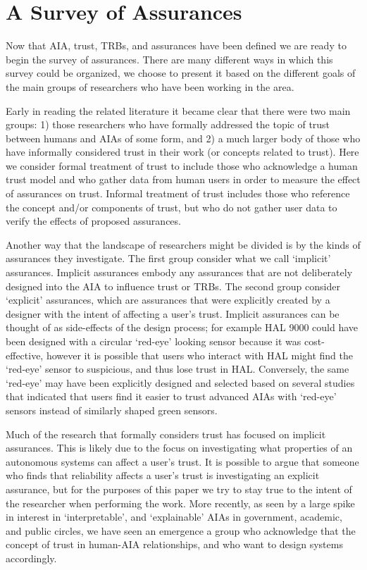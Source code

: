

\section{A Survey of Assurances} \label{sec:survey}
Now that AIA, trust, TRBs, and assurances have been defined we are ready to begin the survey of assurances. There are many different ways in which this survey could be organized, we choose to present it based on the different goals of the main groups of researchers who have been working in the area.

Early in reading the related literature it became clear that there were two main groups: 1) those researchers who have formally addressed the topic of trust between humans and AIAs of some form, and 2) a much larger body of those who have informally considered trust in their work (or concepts related to trust). Here we consider formal treatment of trust to include those who acknowledge a human trust model and who gather data from human users in order to measure the effect of assurances on trust. Informal treatment of trust includes those who reference the concept and/or components of trust, but who do not gather user data to verify the effects of proposed assurances. 

Another way that the landscape of researchers might be divided is by the kinds of assurances they investigate. The first group consider what we call `implicit' assurances. Implicit assurances embody any assurances that are not deliberately designed into the AIA to influence trust or TRBs. The second group consider `explicit' assurances, which are assurances that were explicitly created by a designer with the intent of affecting a user's trust. Implicit assurances can be thought of as side-effects of the design process; for example HAL 9000 could have been designed with a circular `red-eye' looking sensor because it was cost-effective, however it is possible that users who interact with HAL might find the `red-eye' sensor to suspicious, and thus lose trust in HAL. Conversely, the same `red-eye' may have been explicitly designed and selected based on several studies that indicated that users find it easier to trust advanced AIAs with `red-eye' sensors instead of similarly shaped green sensors.

Much of the research that formally considers trust has focused on implicit assurances. This is likely due to the focus on investigating what properties of an autonomous systems can affect a user's trust. It is possible to argue that someone who finds that reliability affects a user's trust is investigating an explicit assurance, but for the purposes of this paper we try to stay true to the intent of the researcher when performing the work. More recently, as seen by a large spike in interest in `interpretable', and `explainable' AIAs in government, academic, and public circles, we have seen an emergence a group who acknowledge that the concept of trust in human-AIA relationships, and who want to design systems accordingly.

